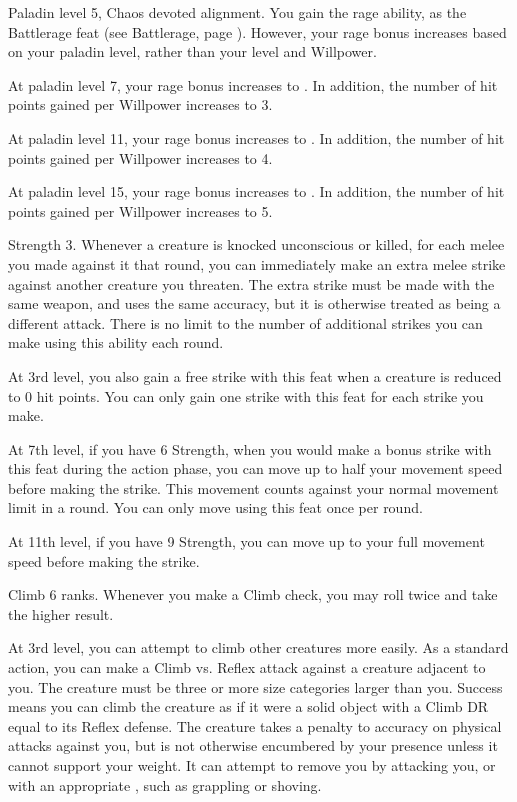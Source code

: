     \featpres Paladin level 5, Chaos devoted alignment.
    \featben You gain the rage ability, as the Battlerage feat (see Battlerage, page ).
    However, your rage bonus increases based on your paladin level, rather than your level and Willpower.

    At paladin level 7, your rage bonus increases to .
    In addition, the number of hit points gained per Willpower increases to 3.

    At paladin level 11, your rage bonus increases to .
    In addition, the number of hit points gained per Willpower increases to 4.

    At paladin level 15, your rage bonus increases to .
    In addition, the number of hit points gained per Willpower increases to 5.

    \featpre Strength 3.
    \featben Whenever a creature is knocked unconscious or killed, for each melee  you made against it that round, you can immediately make an extra melee strike against another creature you threaten.
    The extra strike must be made with the same weapon, and uses the same accuracy, but it is otherwise treated as being a different attack.
    There is no limit to the number of additional strikes you can make using this ability each round.

    At 3rd level, you also gain a free strike with this feat when a creature is reduced to 0 hit points.
    You can only gain one strike with this feat for each strike you make.

    At 7th level, if you have 6 Strength, when you would make a bonus strike with this feat during the action phase, you can move up to half your movement speed before making the strike.
    This movement counts against your normal movement limit in a round.
    You can only move using this feat once per round.

    At 11th level, if you have 9 Strength, you can move up to your full movement speed before making the strike.

    \featpre Climb 6 ranks.
    \featben Whenever you make a Climb check, you may roll twice and take the higher result.

    At 3rd level, you can attempt to climb other creatures more easily.
    As a standard action, you can make a Climb vs. Reflex attack against a creature adjacent to you.
    The creature must be three or more size categories larger than you.
    Success means you can climb the creature as if it were a solid object with a Climb DR equal to its Reflex defense.
    The creature takes a  penalty to accuracy on physical attacks against you, but is not otherwise encumbered by your presence unless it cannot support your weight.
    It can attempt to remove you by attacking you, or with an appropriate , such as grappling or shoving.

